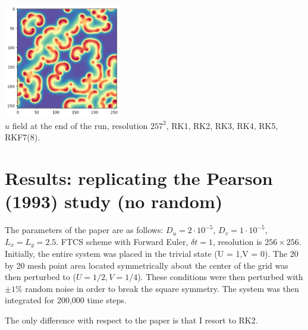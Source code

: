 \begin{center}
\includegraphics[height=5cm]{python_codes/fieldstone_171/RKtest2/alpha1_solution_final_u_RKF78.png}\\
{\captionfont $u$ field at the end of the run, resolution $257^2$, RK1, RK2, RK3, RK4, RK5, RKF7(8).}
\end{center}


\newpage
\section*{Results: replicating the Pearson (1993) study (no random)}

The parameters of the paper are as follows: $D_u=2\cdot 10^{-5}$, $D_v=1\cdot 10^{-5}$,
$L_x=L_y=2.5$. FTCS scheme with Forward Euler, $\delta t=1$, 
resolution is $256 \times 256$.
Initially, the entire system was placed in
the trivial state (U = 1,V = 0). The 20 by 20 mesh point area located symmetrically
about the center of the grid was then
perturbed to ($U = 1/2,V = 1/4$). These
conditions were then perturbed with $\pm 1\%$
random noise in order to break the square
symmetry. The system was then integrated for 200,000 time steps.

The only difference with respect to the paper is that I resort to RK2.

